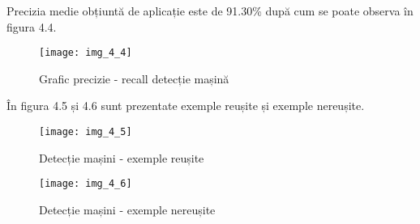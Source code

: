 Precizia medie obțiuntă de aplicație este de 91.30\% după cum se poate observa în figura 4.4.

\begin{figure}[!h]
	\centering
	\texttt{[image: img\_4\_4]}
	\caption{Grafic precizie - recall detecție mașină}
\end{figure}

În figura 4.5 și 4.6 sunt prezentate exemple reușite și exemple nereușite. 

\begin{figure}[!h]
	\centering
	\texttt{[image: img\_4\_5]}
	\caption{Detecție mașini - exemple reușite}
\end{figure}
\begin{figure}[!ht]
	\centering
	\texttt{[image: img\_4\_6]}
	\caption{Detecție mașini - exemple nereușite}
\end{figure}